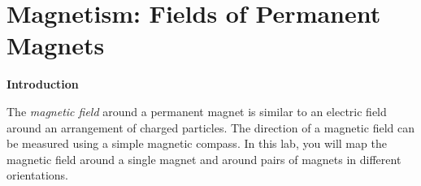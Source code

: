 \section{Magnetism: Fields of Permanent Magnets }


\makelabheader %

\bigskip
\textbf{Introduction} 

The \textit{magnetic field} around a permanent magnet is similar to an electric field around an arrangement of charged particles.  The direction of a magnetic field can be measured using a simple magnetic compass.  In this lab, you will map the magnetic field around a single magnet and around pairs of magnets in different orientations.



